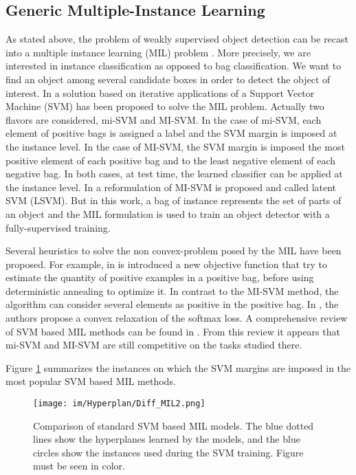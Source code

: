 \documentclass[preprint]{elsarticle}
\begin{document}
\subsection{Generic Multiple-Instance Learning}
\label{sec:GenericMIL}

 As stated above, the problem of weakly supervised object detection can be recast into a multiple instance learning (MIL)  problem \citep{dietterich_solving_1997}. More precisely, we are interested in instance classification as opposed to bag classification. We want to find an object among several candidate boxes in order to detect the object of interest. In \citep{andrews_support_2003}  a solution based on iterative applications of a Support Vector Machine (SVM) has been proposed to solve the MIL problem. Actually two flavors are considered, mi-SVM and MI-SVM. In the case of mi-SVM, each element of positive bags is assigned a label and the SVM margin is imposed at the instance level. In the case of MI-SVM, the SVM margin is imposed the most positive element of each positive bag and to the least negative element of each negative bag. In both cases, at test time, the learned classifier can be applied at the instance level. In \citep{felzenszwalb_object_2010} a reformulation of MI-SVM is proposed and called latent SVM (LSVM). But in this work, a bag of instance represents the set of parts of an object and the MIL formulation is used to train an object detector with a fully-supervised training. 
 
Several heuristics to solve the non convex-problem posed by the MIL have been proposed. For example, in  \citep{gehler_deterministic_2007} is introduced a new objective function that try to estimate the quantity of positive examples in a positive bag, before using deterministic annealing to optimize it. In contrast to the MI-SVM method, the algorithm can consider several elements as positive in the positive bag. In \citep{joulin_convex_2012}, the authors propose a convex relaxation of the softmax loss.  A comprehensive review of SVM based MIL methods can be found in   \citep{doran_theoretical_2014}. From this review it appears that mi-SVM and MI-SVM are still competitive on the tasks studied there. 
 



Figure \ref{fig:MIL_difference} summarizes the instances on which the SVM margins are imposed in the most popular SVM based MIL methods. 

\begin{figure} \centering
    \texttt{[image: im/Hyperplan/Diff\_MIL2.png]}
    \caption{Comparison of standard SVM based MIL models. The blue dotted lines show the hyperplanes learned by the models, and the blue circles show the instances used during the SVM training. Figure must be seen in color.}
    \label{fig:MIL_difference}
\end{figure}
\end{document}
